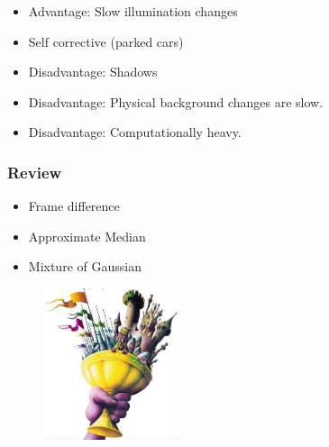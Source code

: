 \documentclass{beamer}
\begin{document}
\begin{frame}

  \begin{itemize}
    \item Advantage: Slow illumination changes
      \item Self corrective (parked cars)
      \item Disadvantage: Shadows
      \item Disadvantage: Physical background changes are slow.
      \item Disadvantage: Computationally heavy.
  \end{itemize}
\end{frame}

\begin{frame}
  \frametitle{Review}
  \begin{itemize}
  \item Frame difference
    \item Approximate Median
      \item Mixture of Gaussian 
  \end{itemize}

  \begin{figure}[h]
    \centering
       \includegraphics[width=4cm ]{holygrail.jpg}%
  \end{figure}

\end{frame}

 
\end{document}
